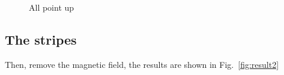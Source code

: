 \documentclass[aps,superscriptaddress,groupedaddress]{revtex4}  %
\begin{document}
\begin{figure}[htb]
\caption{All point up}
\label{fig:result1}
\end{figure}

\subsection{\label{sec:7.2}The stripes}

Then, remove the magnetic field, the results are shown in Fig.~\ref{fig:result2}
\end{document}
